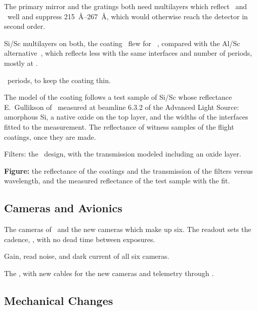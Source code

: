 \begin{outline}
\item The primary mirror and the gratings both need multilayers which reflect \NeVII\ and \SiXII\
    well and suppress \SIrange{215}{267}{\angstrom}, which would otherwise reach the detector in
    second order.
\item Si/Sc multilayers on both, the coating \SUTRI\ flew for \NeVII~\citep{Bai2023,Wu2022},
    compared with the Al/Sc alternative~\citep{Rebellato2020,Rebellato2021}, which reflects less
    with the same interfaces and number of periods, mostly at \SiXII.
\item \numPeriodsCoating\ periods, to keep the coating thin.
\item The model of the coating follows a test sample of Si/Sc whose reflectance E.~Gullikson of
    \LBNL\ measured at beamline 6.3.2 of the Advanced Light Source: amorphous Si, a native oxide
    on the top layer, and the widths of the interfaces fitted to the measurement.
    The reflectance of witness samples of the flight coatings, once they are made.
\item Filters: the \ESISI\ design, with the transmission modeled including an oxide layer.
\item \textbf{Figure:} the reflectance of the coatings and the transmission of the filters versus
    wavelength, and the measured reflectance of the test sample with the fit.
\end{outline}

%
\subsection{Cameras and Avionics}%
\label{subsec:CamerasandAvionics}%

\begin{outline}
\item The cameras of \ESISI\ and the new cameras which make up six.
    The readout sets the cadence, \cadence, with no dead time between exposures.
\item Gain, read noise, and dark current of all six cameras. \roy{Measured with
    \texttt{msfc-ccd}.}
\item The \DACS, with new cables for the new cameras and telemetry through \EVTM.
\end{outline}

%
\subsection{Mechanical Changes}%
\label{subsec:MechanicalChanges}%

